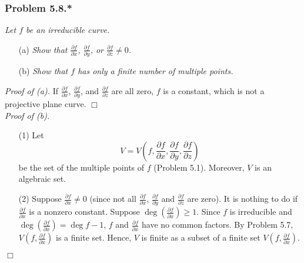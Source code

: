 \documentclass{article}
\begin{document}



\subsubsection*{Problem 5.8.*}
\emph{Let $f$ be an irreducible curve.}
\begin{enumerate}
\item[(a)]
  \emph{Show that
  $\frac{\partial f}{\partial x}$,
  $\frac{\partial f}{\partial y}$,
  or $\frac{\partial f}{\partial z} \neq 0$.}

\item[(b)]
  \emph{Show that $f$ has only a finite number of multiple points.} \\
\end{enumerate}



\emph{Proof of (a).}
  If $\frac{\partial f}{\partial x}$,
  $\frac{\partial f}{\partial y}$,
  and $\frac{\partial f}{\partial z}$ are all zero,
  $f$ is a constant, which is not a projective plane curve.
$\Box$ \\



\emph{Proof of (b).}
\begin{enumerate}
\item[(1)]
  Let
  \[
    V
    = V\left(
      f,
      \frac{\partial f}{\partial x},
      \frac{\partial f}{\partial y},
      \frac{\partial f}{\partial z}
    \right)
  \]
  be the set of the multiple points of $f$ (Problem 5.1).
  Moreover, $V$ is an algebraic set.

\item[(2)]
  Suppose $\frac{\partial f}{\partial x} \neq 0$
  (since not all $\frac{\partial f}{\partial x}$,
  $\frac{\partial f}{\partial y}$ and
  $\frac{\partial f}{\partial z}$ are zero).
  It is nothing to do if $\frac{\partial f}{\partial x}$ is a nonzero constant.
  Suppose $\deg\left( \frac{\partial f}{\partial x} \right) \geq 1$.
  Since $f$ is irreducible and $\deg\left( \frac{\partial f}{\partial x} \right) = \deg f - 1$,
  $f$ and $\frac{\partial f}{\partial x}$ have no common factors.
  By Problem 5.7,
  $V\left( f, \frac{\partial f}{\partial x} \right)$ is a finite set.
  Hence,
  $V$ is finite
  as a subset of a finite set $V\left( f, \frac{\partial f}{\partial x} \right)$.
\end{enumerate}
$\Box$ \\\\
\end{document}
